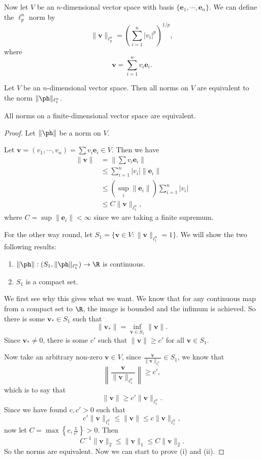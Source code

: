 \documentclass[a4paper]{article}
\begin{document}
Now let $V$ be an $n$-dimensional vector space with basis $\{\mathbf{e}_1, \cdots, \mathbf{e}_n\}$. We can define the $\ell_p^n$ norm by
\[
  \|\mathbf{v}\|_{\ell_p^n} = \left(\sum_{i = 1}^n |v_i|^p \right)^{1/p},
\]
where
\[
  \mathbf{v} = \sum_{i = 1}^n v_i \mathbf{e}_i.
\]
\begin{prop}
  Let $V$ be an $n$-dimensional vector space. Then all norms on $V$ are equivalent to the norm $\|\ph\|_{\ell_1^n}$.
\end{prop}

\begin{cor}
  All norms on a finite-dimensional vector space are equivalent.
\end{cor}

\begin{proof}
  Let $\|\ph \|$ be a norm on $V$.

  Let $\mathbf{v} = (v_1, \cdots, v_n) = \sum v_i \mathbf{e}_i \in V$. Then we have
  \begin{align*}
    \|\mathbf{v}\| &= \left\|\sum v_i \mathbf{e}_i\right\|\\
    &\leq \sum_{i = 1}^n |v_i|\|\mathbf{e}_i\|\\
    &\leq \left(\sup_i \|\mathbf{e}_i\|\right) \sum_{i = 1}^n |v_i|\\
    &\leq C\|\mathbf{v}\|_{\ell_1^n},
  \end{align*}
  where $C = \sup \|\mathbf{e}_i\| < \infty$ since we are taking a finite supremum.

  For the other way round, let $S_1 = \{\mathbf{v}\in V: \|\mathbf{v}\|_{\ell_1^n} = 1\}$. We will show the two following results:
  \begin{enumerate}
    \item $\|\ph \|: (S_1, \|\ph \|_{\ell_1^n}) \to \R$ is continuous.
    \item $S_1$ is a compact set.
  \end{enumerate}
  We first see why this gives what we want. We know that for any continuous map from a compact set to $\R$, the image is bounded and the infimum is achieved. So there is some $\mathbf{v}_* \in S_1$ such that
  \[
    \|\mathbf{v}_*\| = \inf_{\mathbf{v}\in S_1} \|\mathbf{v}\|.
  \]
  Since $\mathbf{v}_*\not= 0$, there is some $c'$ such that $\|\mathbf{v}\| \geq c'$ for all $\mathbf{v} \in S_1$.

  Now take an arbitrary non-zero $\mathbf{v} \in V$, since $\frac{\mathbf{v}}{\|\mathbf{v}\|_{\ell_1^n}} \in S_1$, we know that
  \[
    \left\|\frac{\mathbf{v}}{\|\mathbf{v}\|_{\ell_1^n}}\right\| \geq c',
  \]
  which is to say that
  \[
    \|\mathbf{v}\| \geq c' \|\mathbf{v}\|_{\ell_1^n}.
  \]
  Since we have found $c, c' > 0$ such that
  \[
    c' \|\mathbf{v}\|_{\ell_1^n} \leq \|\mathbf{v}\|\leq c \| \mathbf{v}\|_{\ell_1^n},
  \]
  now let $C = \max\left\{c, \frac{1}{c'}\right\} > 0$. Then
  \[
    C^{-1}\|\mathbf{v}\|_2 \leq \|\mathbf{v}\|_1 \leq C\|\mathbf{v}\|_2.
  \]
  So the norms are equivalent. Now we can start to prove (i) and (ii).


\end{proof}
\end{document}
